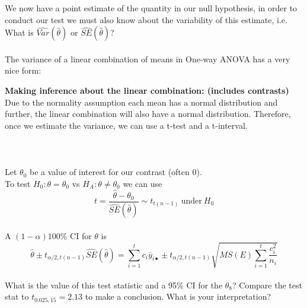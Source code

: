 We now have a point estimate of the quantity in our null hypothesis, in order to conduct our test we must also know about the variability of this estimate, i.e. What is $\hat{Var}(\hat{\theta})$ or $\hat{SE}(\hat{\theta})$?\\~\\
The variance of a linear combination of means in One-way ANOVA has a very nice form:

\newpage


\Large\textbf{Making inference about the linear combination: (includes contrasts)}\large\\
Due to the normality assumption each mean has a normal distribution and further, the linear combination will also have a normal distribution.  Therefore, once we estimate the variance, we can use a t-test and a t-interval.\\~\\~\\~\\
Let $\theta_0$ be a value of interest for our contrast (often 0). \\
To test $H_{0}:\theta=\theta_{0}$ vs $H_{A}:\theta\neq \theta_{0}$ we can use
        $$t=\frac{\hat{\theta}-\theta_{0}}{\hat{SE}(\hat{\theta})}\sim t_{t(n-1)}~\text{under}~H_{0}$$~\\
				
A $(1-\alpha)100$\% CI for $\theta$ is
$$\hat{\theta}\pm t_{\alpha/2,t(n-1)}\hat{SE}(\hat{\theta}) = \sum_{i=1}^{t}c_{i}\bar{y}_{i\bullet}\pm t_{\alpha/2,t(n-1)}\sqrt{MS(E)\sum_{i=1}^{t}\frac{c_{i}^2}{n_{i}}}$$~\\

What is the value of this test statistic and a 95\% CI for the $\theta_8$?  Compare the test stat to $t_{0.025,15}=2.13$ to make a conclusion.  What is your interpretation?

\newpage

